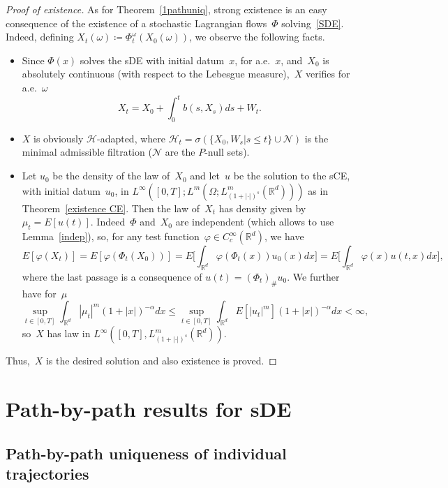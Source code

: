 \documentclass[a4paper,10pt]{article}
\newcommand\1{\mathbbm{1}}
\newcommand{\mc}{\mathcal}
\numberwithin{equation}{section}
\begin{document}
\begin{proof}[Proof of existence]
As for Theorem~\ref{1pathuniq}, strong existence is an easy consequence of the existence of a stochastic Lagrangian flows~$\Phi$ solving~\eqref{SDE}. Indeed, defining $X_t(\omega)\coloneqq \Phi_t^\omega(X_0(\omega))$, we observe the following facts.
\begin{itemize}
\item Since $\Phi(x)$ solves the sDE with initial datum~$x$, for a.e.~$x$, and~$X_0$ is absolutely continuous (with respect to the Lebesgue measure),~$X$ verifies for a.e.~$\omega$
\begin{equation*}
X_t=X_0+\int^t_0 b(s,X_s)ds+W_t.
\end{equation*}
\item $X$ is obviously $\mc{H}$-adapted, where $\mc{H}_t=\sigma(\{X_0,W_s|s\le t\}\cup\mathcal{N})$ is the minimal admissible filtration ($\mathcal{N}$ are the $P$-null sets).
\item Let $u_0$ be the density of the law of~$X_0$ and let~$u$ be the solution to the sCE, with initial datum~$u_0$, in $L^\infty([0,T];L^m(\Omega;L^m_{(1+|\cdot|)^s}(\mathbb{R}^d)))$ as in Theorem~\ref{existence CE}. Then the law of~$X_t$ has density given by $\mu_t=E[u(t)]$. Indeed~$\Phi$ and~$X_0$ are independent (which allows to use Lemma~\ref{indep}), so, for any test function~$\varphi \in C_c^\infty(\mathbb{R}^d)$, we have
\begin{equation*}
E[\varphi(X_t)]=E[\varphi(\Phi_t(X_0))]=E\Big[\int_{\mathbb{R}^d}\varphi(\Phi_t(x))u_0(x)dx\Big] =E\Big[\int_{\mathbb{R}^d}\varphi(x)u(t,x)dx\Big],
\end{equation*}
where the last passage is a consequence of $u(t)=(\Phi_t)_\#u_0$. We further have for~$\mu$
\begin{equation*}
\sup_{t\in[0,T]}\int_{\mathbb{R}^d}|\mu_t|^m(1+|x|)^{-\alpha}dx\le \sup_{t\in[0,T]}\int_{\mathbb{R}^d}E[|u_t|^m](1+|x|)^{-\alpha}dx <\infty ,
\end{equation*}
so~$X$ has law in $L^\infty([0,T],L^m_{(1+|\cdot|)^s}(\mathbb{R}^d))$.
\end{itemize}
Thus,~$X$ is the desired solution and also existence is proved.
\end{proof}

\section{Path-by-path results for sDE}

\subsection{Path-by-path uniqueness of individual trajectories}
\end{document}
